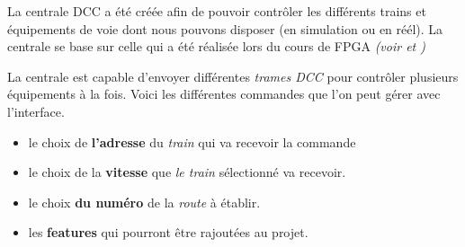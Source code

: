 La centrale DCC a été créée afin de pouvoir contrôler les
différents trains et équipements de voie dont nous pouvons
disposer (en simulation ou en réél).
\medskip
La centrale se base sur celle qui a été réalisée lors du cours de FPGA  \emph{(voir \cite{rapport} et \cite{sujet})}

La centrale est capable d'envoyer différentes \emph{trames DCC}
pour contrôler plusieurs équipements à la fois. Voici les différentes
commandes que l'on peut gérer avec l'interface.


\begin{itemize}
    \item le choix de \textbf{l'adresse} du \emph{train} qui va
      recevoir la commande
    \item le choix de la \textbf{vitesse} que \emph{le train} s\'electionn\'e
      va recevoir. 
    \item le choix  \textbf{du numéro} de la \emph{route} \`a \'etablir.
    \item les \textbf{features} qui pourront \^etre rajout\'ees au
      projet. 
  \end{itemize}


